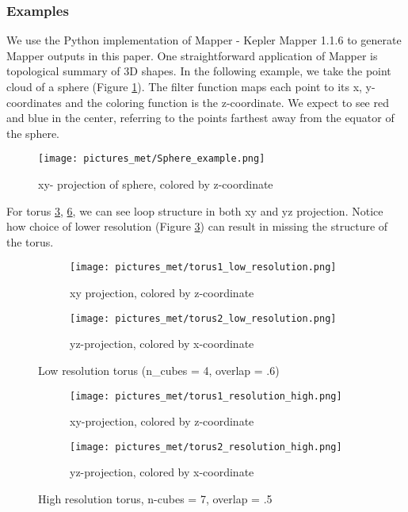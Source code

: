 \documentclass[12pt]{article}
\theoremstyle{definition}
\begin{document}
\subsubsection{Examples}
We use the Python implementation of Mapper - Kepler Mapper 1.1.6 \cite{keppler-mapper} to generate Mapper outputs in this paper. One straightforward application of Mapper is topological summary of 3D shapes. In the following example, we take the point cloud of a sphere (Figure \ref{mapper_sphere}). The filter function maps each point to its x, y-coordinates and the coloring function is the z-coordinate. We expect to see red and blue in the center, referring to the points farthest away from the equator of the sphere.
\begin{figure}[h]
\centering
\texttt{[image: pictures\_met/Sphere\_example.png]}
\caption{xy- projection of sphere, colored by z-coordinate}
\label{mapper_sphere}
\end{figure}
\par For torus \ref{low_resolution_torus}, \ref{high_resolution_torus}, we can see loop structure in both xy and yz projection. Notice how choice of lower resolution (Figure \ref{low_resolution_torus}) can result in missing the structure of the torus. 
\begin{figure}
\centering
\begin{subfigure}{.5\textwidth}
  \centering
  \texttt{[image: pictures\_met/torus1\_low\_resolution.png]}
  \caption{xy projection, colored by z-coordinate}
\end{subfigure}%
\begin{subfigure}{.5\textwidth}
  \centering
  \texttt{[image: pictures\_met/torus2\_low\_resolution.png]}
  \caption{yz-projection, colored by x-coordinate}
  \label{fig:sub2}
\end{subfigure}
\caption{Low resolution torus (n_cubes = 4, overlap = .6)}
\label{low_resolution_torus}
\end{figure}

\begin{figure}
\centering
\begin{subfigure}{.5\textwidth}
  \centering
  \texttt{[image: pictures\_met/torus1\_resolution\_high.png]}
  \caption{xy-projection, colored by z-coordinate}
  \label{fig:sub1}
\end{subfigure}%
\begin{subfigure}{.5\textwidth}
  \centering
  \texttt{[image: pictures\_met/torus2\_resolution\_high.png]}
  \caption{yz-projection, colored by x-coordinate}
  \label{fig:sub2}
\end{subfigure}
\caption{High resolution torus, n-cubes = 7, overlap = .5}
\label{high_resolution_torus}
\end{figure}
\end{document}
